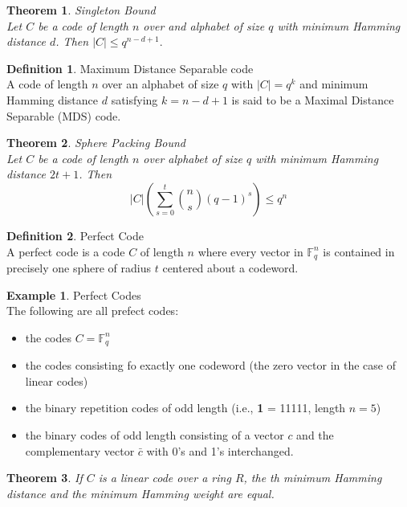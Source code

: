 \documentclass{article}
\newcommand{\F}{\mathbb{F}}
\newtheorem{theorem}{Theorem}
\theoremstyle{definition}
\newtheorem{definition}{Definition}
\newtheorem{example}{Example}
\begin{document}
\begin{theorem}{Singleton Bound}\\
  Let $C$ be a code of length $n$ over and alphabet of size $q$ with minimum Hamming distance $d$. Then $|C| \leq q^{n-d+1}.$
\end{theorem}

\begin{definition}{Maximum Distance Separable code}\\
  A code of length $n$ over an alphabet of size $q$ with $|C| = q^k$ and minimum Hamming distance $d$ satisfying $k=n-d+1$ is said to be a Maximal Distance Separable (MDS) code.
\end{definition}

\begin{theorem}{Sphere Packing Bound}\\
  Let $C$ be a code of length $n$ over alphabet of size $q$ with minimum Hamming distance $2t+1$. Then
  \[|C|\left(\sum_{s=0}^t {n \choose s}(q-1)^s\right)\leq q^n\]
\end{theorem}

\begin{definition}{Perfect Code}\\
  A perfect code is a code $C$ of length $n$ where every vector in $\F_q^n$ is contained in precisely one sphere of radius $t$ centered about a codeword.
\end{definition}

\begin{example}{Perfect Codes}\\
  The following are all prefect codes:
  \begin{itemize}
    \item the codes $C = \F_q^n$
    \item the codes consisting fo exactly one codeword (the zero vector in the case of linear codes)
    \item the binary repetition codes of odd length (i.e., \textbf{1} = 11111, length $n=5$)
    \item the binary codes of odd length consisting of a vector $c$ and the complementary vector $\bar{c}$ with 0's and 1's interchanged.
  \end{itemize}
\end{example}

\begin{theorem}
  If $C$ is a linear code over a ring $R$, the th minimum Hamming distance and the minimum Hamming weight are equal.
\end{theorem}
\end{document}
